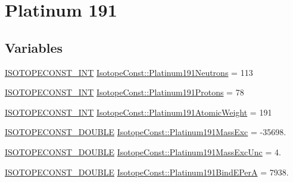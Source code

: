 \hypertarget{group___isotope_const-_platinum-_pt191}{}\section{Platinum 191}
\label{group___isotope_const-_platinum-_pt191}
\subsection*{Variables}
\begin{DoxyCompactItemize}
\item 
\mbox{\hyperlink{group___isotope_const-_macros_ga5f18360b3e99483a35c32d789e62621c}{I\+S\+O\+T\+O\+P\+E\+C\+O\+N\+S\+T\+\_\+\+I\+NT}} \mbox{\hyperlink{group___isotope_const-_platinum-_pt191_ga6c13a2bd210cba6211e6b1b3c3b8d407}{Isotope\+Const\+::\+Platinum191\+Neutrons}} = 113
\item 
\mbox{\hyperlink{group___isotope_const-_macros_ga5f18360b3e99483a35c32d789e62621c}{I\+S\+O\+T\+O\+P\+E\+C\+O\+N\+S\+T\+\_\+\+I\+NT}} \mbox{\hyperlink{group___isotope_const-_platinum-_pt191_gabbe09cf6957714729edad15d8c605c04}{Isotope\+Const\+::\+Platinum191\+Protons}} = 78
\item 
\mbox{\hyperlink{group___isotope_const-_macros_ga5f18360b3e99483a35c32d789e62621c}{I\+S\+O\+T\+O\+P\+E\+C\+O\+N\+S\+T\+\_\+\+I\+NT}} \mbox{\hyperlink{group___isotope_const-_platinum-_pt191_gab3ed6348ca27863478fbc39ae639d3b9}{Isotope\+Const\+::\+Platinum191\+Atomic\+Weight}} = 191
\item 
\mbox{\hyperlink{group___isotope_const-_macros_ga8f45a7272ce02c0b4c65c44636ed719a}{I\+S\+O\+T\+O\+P\+E\+C\+O\+N\+S\+T\+\_\+\+D\+O\+U\+B\+LE}} \mbox{\hyperlink{group___isotope_const-_platinum-_pt191_ga0399d58103142c8cd962bb206ce71336}{Isotope\+Const\+::\+Platinum191\+Mass\+Exc}} = -\/35698.
\item 
\mbox{\hyperlink{group___isotope_const-_macros_ga8f45a7272ce02c0b4c65c44636ed719a}{I\+S\+O\+T\+O\+P\+E\+C\+O\+N\+S\+T\+\_\+\+D\+O\+U\+B\+LE}} \mbox{\hyperlink{group___isotope_const-_platinum-_pt191_ga3806252c624d9e8741cf7370c89920a9}{Isotope\+Const\+::\+Platinum191\+Mass\+Exc\+Unc}} = 4.
\item 
\mbox{\hyperlink{group___isotope_const-_macros_ga8f45a7272ce02c0b4c65c44636ed719a}{I\+S\+O\+T\+O\+P\+E\+C\+O\+N\+S\+T\+\_\+\+D\+O\+U\+B\+LE}} \mbox{\hyperlink{group___isotope_const-_platinum-_pt191_ga71bc14d972c42b740d4a7f68361e5ea0}{Isotope\+Const\+::\+Platinum191\+Bind\+E\+PerA}} = 7938.
\item 

\end{DoxyCompactItemize}
